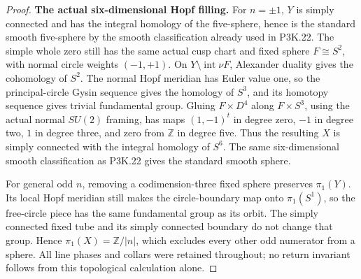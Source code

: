 \begin{proof}
\par\medskip\noindent\textbf{The actual six-dimensional Hopf filling.}
For \(n=\pm1\), \(Y\) is simply connected and has the
integral homology of the five-sphere, hence is the standard smooth
five-sphere by the smooth classification already used in P3K.22.
The simple whole zero still has the same actual cusp chart and
fixed sphere \(F\cong S^2\), with normal circle weights
\((-1,+1)\). On \(Y\setminus\operatorname{int}\nu F\),
Alexander duality gives the cohomology of \(S^2\). The normal
Hopf meridian has Euler value one, so the principal-circle Gysin
sequence gives the homology of \(S^3\), and its homotopy sequence
gives trivial fundamental group. Gluing \(F\times D^4\) along
\(F\times S^3\), using the actual normal \(SU(2)\) framing,
has maps \((1,-1)^t\) in degree zero, \(-1\) in degree two,
\(1\) in degree three, and zero from \(\mathbb Z\) in degree
five. Thus the resulting \(X\) is simply connected with the
integral homology of \(S^6\). The same six-dimensional smooth
classification as P3K.22 gives the standard smooth sphere.

For general odd \(n\), removing a codimension-three fixed sphere
preserves \(\pi_1(Y)\). Its local Hopf meridian still makes the
circle-boundary map onto \(\pi_1(S^1)\), so the free-circle
piece has the same fundamental group as its orbit. The simply
connected fixed tube and its simply connected boundary do not
change that group. Hence \(\pi_1(X)=\mathbb Z/|n|\), which
excludes every other odd numerator from a sphere. All line phases
and collars were retained throughout; no return invariant follows
from this topological calculation alone.
\end{proof}
